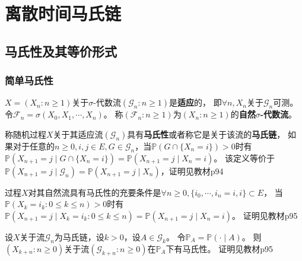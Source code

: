 \documentclass[main]{subfiles}
\begin{document}
\section{离散时间马氏链}%
\subsection{马氏性及其等价形式}
\subsubsection{简单马氏性}
\begin{definition}\label{def:adapt}
  \(X=(X_n:n \geq 1)\)关于\(\sigma\)-代数流\((\mathcal{G}_n:n \geq 1)\)是\textbf{适应}的，
  即\(\forall n,X_n\)关于\(\mathcal{G}_n\)可测。
  令\(\mathcal{F}_n=\sigma(X_0,X_1,\cdots,X_n)\)。
  称\((\mathcal{F}_n:n \geq 1)\)为\((X_n:n \geq 1)\)的\textbf{自然\(\sigma\)-代数流}。
\end{definition}
\begin{definition}\label{def:markov_property}
  称随机过程\(X\)关于其适应流\((\mathcal{G}_n)\)具有\textbf{马氏性}或者称它是关于该流的\textbf{马氏链}，
  如果对于任意的\(n \geq 0,i,j \in E,G \in \mathcal{G}_n\)，当\(\mathbb{P}(G \cap \{X_n=i\})>0\)时有
  \(\mathbb{P}(X_{n+1}=j \mid G \cap \{X_n=i\})=\mathbb{P}(X_{n+1}=j \mid X_n=i)\)。
  该定义等价于\(\mathbb{P}(X_{n+1}=j \mid \mathcal{G}_n)=\mathbb{P}(X_{n+1} =j \mid X_n)\)，证明见教材p94
\end{definition}
\begin{theorem}\label{the:zirjlq}
  过程\(X\)对其自然流具有马氏性的充要条件是\(\forall n \geq 0,\{i_0,\cdots,i_n=i,i\} \subset E\)，
  当\(\mathbb{P}(X_k=i_k:0 \leq k \leq n)>0\)时有
  \(\mathbb{P}(X_{n+1}=j \mid X_k=i_k:0 \leq k \leq n)=\mathbb{P}(X_{n+1}=j \mid X_n=i)\)。
  证明见教材p95 
\end{theorem}
\begin{theorem}\label{the:tnjmmauixk}
  设\(X\)关于流\(\mathcal{G}_n\)为马氏链，设\(k>0\)，设\(A \in \mathcal{G}_k\)。
  令\(\mathbb{P}_A=\mathbb{P}(\cdot \mid A)\)。
  则\((X_{k+n}:n \geq 0)\)关于流\((\mathcal{G}_{k+n}:n \geq 0)\)在\(\mathbb{P}_A\)下有马氏性。
  证明见教材p95 
\end{theorem}
\end{document}
